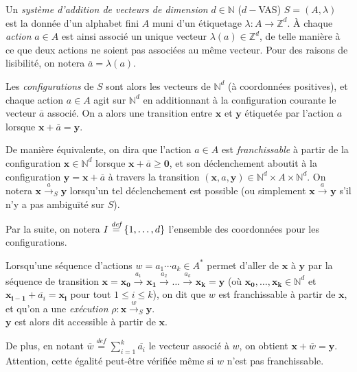 \documentclass[a4paper,final]{article}
\theoremstyle{definition}
\let\leq\leqslant
\let\geq\geqslant
\newcommand{\os}[1]{\left\{\mathinner{#1}\right\}}
\newcommand{\defeq}{\ensuremath{\stackrel{\textit{def}}{=}}}
\newcommand{\N}{\ensuremath{\mathbb{N}}}
\newcommand{\Z}{\ensuremath{\mathbb{Z}}}
\newcommand{\trans}[2]{\ensuremath{\stackrel{#1}{\longrightarrow}_{#2}}}
\newcommand{\vect}[1]{\ensuremath{\mathbf{#1}}}
\newcommand{\valeur}[1]{\ensuremath{\overline{#1}}}
\begin{document}
Un \emph{système d'addition de vecteurs de dimension} $d\in\N$ ($d-$VAS) $S=(A,\lambda)$ est la donnée 
d'un alphabet fini $A$ muni d'un étiquetage $\lambda:A\to\Z^d$.
À chaque \emph{action} $a\in A$ est ainsi associé un unique vecteur $\lambda(a)\in \Z^d$, de telle manière à ce que deux actions ne soient pas associées au même vecteur.
Pour des raisons de lisibilité, on notera $\valeur{a}=\lambda(a)$.
\vspace{3mm}

Les \emph{configurations} de $S$ sont alors les vecteurs de $\N^d$ (à coordonnées positives), 
et chaque action $a\in A$ agit sur $\N^d$ en additionnant à la configuration courante le vecteur $\valeur{a}$ associé.
On a alors une transition entre $\vect{x}$ et $\vect{y}$ étiquetée par l'action $a$ lorsque $\vect{x} + \valeur{a} = \vect{y}$.

De manière équivalente, on dira que l'action $a\in A$ est \emph{franchissable} 
à partir de la configuration $\vect{x}\in \N^d$ lorsque $\vect{x} + \valeur{a} \geq \vect{0}$,
et son déclenchement aboutit à la configuration $\vect{y} = \vect{x} + \valeur{a}$ à travers la transition $(\vect{x},a,\vect{y})\in \N^d\times A\times \N^d$.
On notera $\vect{x}\trans{a}{S} \vect{y}$ lorsqu'un tel déclenchement est possible (ou simplement $\vect{x}\trans{a}{} \vect{y}$ s'il n'y a pas ambiguïté sur $S$).

\begin{center}
Par la suite, on notera $I \defeq \os{1,\dots,d}$ l'ensemble des coordonnées pour les configurations.
\end{center}


Lorsqu'une séquence d'actions $w= a_1\cdots a_k\in A^\ast$ permet d'aller de $\vect{x}$ à $\vect{y}$ par la séquence de transition $\vect{x}= \vect{x_0}\trans{a_1}{} \vect{x_1}\trans{a_2}{} \dots\trans{a_k}{} \vect{x_k}=\vect{y}$
(où $\vect{x_0},\dots,\vect{x_k} \in\N^d$ et $\vect{x_{i-1}} +\valeur{a_i} =\vect{x_i}$ pour tout $1\leq i\leq k$),
on dit que $w$ est franchissable à partir de $\vect{x}$, et qu'on a une \emph{exécution} $\rho :\vect{x}\trans{w}{S} \vect{y}$.\\
$\vect{y}$ est alors dit accessible à partir de $\vect{x}$.

De plus, en notant $\valeur{w}\defeq \sum^k_{i=1} \valeur{a_i}$ le vecteur associé à $w$, on obtient $\vect{x} +\valeur{w} = \vect{y}$.
Attention, cette égalité peut-être vérifiée même si $w$ n'est pas franchissable.
\vspace{3mm}
\end{document}
